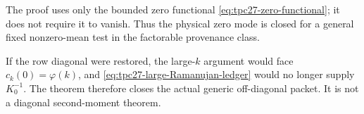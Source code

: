 \begin{remark}
\label{rem:tpc27-general-mean}
The proof uses only the bounded zero functional
\eqref{eq:tpc27-zero-functional}; it does not require it to vanish.
Thus the physical zero mode is closed for a general fixed nonzero-mean
test in the factorable provenance class.
\end{remark}

\begin{remark}
\label{rem:tpc27-diagonal-boundary}
If the row diagonal were restored, the large-\(k\) argument would face
\(c_k(0)=\varphi(k)\), and
\eqref{eq:tpc27-large-Ramanujan-ledger} would no longer supply
\(K_0^{-1}\).  The theorem therefore closes the actual generic
off-diagonal packet.  It is not a diagonal second-moment theorem.
\end{remark}
